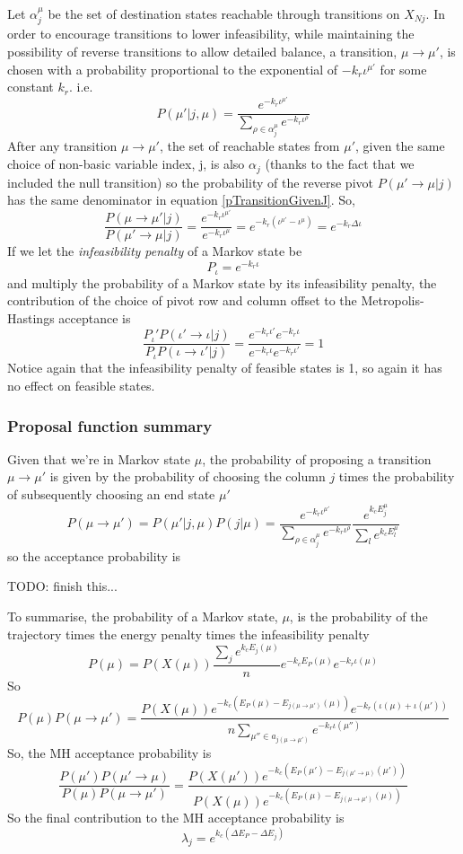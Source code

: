 \documentclass{article}
\begin{document}
Let $\alpha^\mu_j$ be the set of destination states reachable through transitions on $X_{Nj}$. In order to encourage transitions to lower infeasibility, while maintaining the possibility of reverse transitions to allow detailed balance, a transition, $\mu\to\mu'$, is chosen with a probability proportional to the exponential of $-k_r\iota^{\mu'}$ for some constant $k_r$. i.e.
\begin{equation}
P(\mu'|j,\mu) = \frac{e^{-k_r\iota^{\mu'}}}{\sum_{\rho \in \alpha^\mu_j}  e^{-k_r\iota^\rho}}
\label{pTransitionGivenJ}
\end{equation}
After any transition $\mu\to\mu'$, the set of reachable states from $\mu'$, given the same choice of non-basic variable index, j, is also $\alpha_j$ (thanks to the fact that we included the null transition) so the probability of the reverse pivot $P(\mu' \to \mu|j)$ has the same denominator in equation \ref{pTransitionGivenJ}. So,
\[
\frac{P(\mu \to \mu'|j)}{P(\mu' \to \mu|j)} = \frac{e^{-k_r\iota^{\mu'}}}{e^{-k_r\iota^\mu}} = e^{-k_r(\iota^{\mu'}-\iota^\mu)} = e^{-k_r\Delta\iota}
\]
If we let the \textit{infeasibility penalty} of a Markov state be
\[
P_\iota = e^{-k_r\iota}
\]
and multiply the probability of a Markov state by its infeasibility penalty, the contribution of the choice of pivot row and column offset to the Metropolis-Hastings acceptance is
\[
\frac{P_\iota' P(\iota'\to\iota|j)}{P_\iota P(\iota\to\iota'|j)} = \frac{e^{-k_r\iota'}e^{-k_r\iota}}{e^{-k_r\iota}e^{-k_r\iota'}} = 1
\]
Notice again that the infeasibility penalty of feasible states is 1, so again it has no effect on feasible states.

\subsubsection{Proposal function summary}

Given that we're in Markov state $\mu$, the probability of proposing a transition $\mu\to\mu'$ is given by the probability of choosing the column $j$ times the probability of subsequently choosing an end state $\mu'$
\[
P(\mu \rightarrow \mu') = P(\mu'|j,\mu)P(j|\mu) =
\frac{e^{-k_r \iota^{\mu'}}}{\sum_{\rho \in \alpha^\mu_j}e^{-k_r\iota^\rho}}
\frac{e^{k_c E^\mu_j}}{\sum_l e^{k_c E^\mu_l}}
\]
so the acceptance probability is

TODO: finish this...

To summarise, the probability of a Markov state, $\mu$, is the probability of the trajectory times the energy penalty times the infeasibility penalty
\[
P(\mu) = P(X(\mu))\frac{\sum_j e^{k_cE_j(\mu)}}{n} e^{-k_cE_P(\mu)}e^{-k_r\iota(\mu)}
\]
So
\[
P(\mu)P(\mu\rightarrow\mu') = 
\frac{P(X(\mu))e^{-k_c(E_P(\mu) - E_{j(\mu\rightarrow\mu')}(\mu))}e^{-k_r(\iota(\mu)+\iota(\mu'))}}
{n\sum_{\mu'' \in a_{j(\mu\rightarrow\mu')}}e^{-k_r\iota(\mu'')}} 
\]
So, the MH acceptance probability is
\[
\frac{P(\mu')P(\mu'\rightarrow \mu)}{P(\mu)P(\mu\rightarrow \mu')} =
\frac{P(X(\mu'))e^{-k_c(E_P(\mu') - E_{j(\mu'\rightarrow\mu)}(\mu'))}}
{P(X(\mu))e^{-k_c(E_P(\mu) - E_{j(\mu\rightarrow\mu')}(\mu))}}
\]
So the final contribution to the MH acceptance probability is 
\[
\lambda_j = e^{k_c(\Delta E_P - \Delta E_j)}
\]
\end{document}
